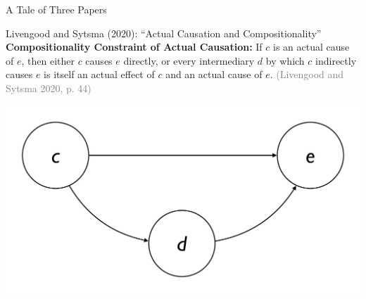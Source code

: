 \documentclass[xcolor=table,9pt,aspectratio=169]{beamer}
\begin{document}
\begin{frame}{\vspace*{10mm}A Tale of Three Papers}
\begin{multicols}{3}
\begin{center}
\end{center}
\end{multicols}
\end{frame}


\begin{frame}{\vspace*{10mm}Livengood and Sytsma (2020): ``Actual Causation and Compositionality''}
\vspace*{-5mm}
\textbf{Compositionality Constraint of Actual Causation:} If $c$ is an actual cause of $e$, then either $c$ causes $e$ directly, or every intermediary $d$ by which $c$ indirectly causes $e$ is itself an actual effect of $c$ and an actual cause of $e$. \textcolor{gray}{(Livengood and Sytsma 2020, p. 44)}
\begin{center}
   \includegraphics[width=0.5\linewidth]{figures/constraint.pdf}
\end{center}
\end{frame}
\end{document}

